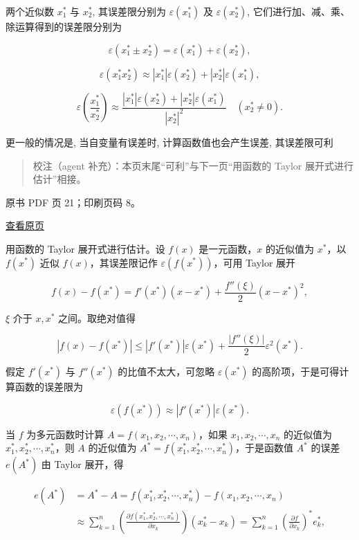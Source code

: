 两个近似数 \(x_1^*\) 与 \(x_2^*\), 其误差限分别为 \(\varepsilon(x_1^*)\) 及 \(\varepsilon(x_2^*)\), 它们进行加、减、乘、除运算得到的误差限分别为

\[
\varepsilon(x_1^* \pm x_2^*) = \varepsilon(x_1^*) + \varepsilon(x_2^*),
\]

\[
\varepsilon(x_1^* x_2^*) \approx |x_1^*| \varepsilon(x_2^*) + |x_2^*| \varepsilon(x_1^*),
\]

\[
\varepsilon\left(\frac{x_1^*}{x_2^*}\right) \approx \frac{|x_1^*| \varepsilon(x_2^*) + |x_2^*| \varepsilon(x_1^*)}{|x_2^*|^2} \quad (x_2^* \neq 0).
\]

更一般的情况是, 当自变量有误差时, 计算函数值也会产生误差, 其误差限可利

\begin{quote}
校注（agent 补充）：本页末尾``可利''与下一页``用函数的 Taylor 展开式进行估计''相接。
\end{quote}

\clearpage

原书 PDF 页 21；印刷页码 8。

\href{source-images/pdf-021.jpeg}{查看原页}

用函数的 Taylor 展开式进行估计。设 \(f(x)\) 是一元函数，\(x\) 的近似值为 \(x^*\)，以 \(f(x^*)\) 近似 \(f(x)\)，其误差限记作 \(\varepsilon(f(x^*))\)，可用 Taylor 展开

\[
f(x)-f(x^*)=f'(x^*)(x-x^*)+\frac{f''(\xi)}{2}(x-x^*)^2,
\]

\(\xi\) 介于 \(x,x^*\) 之间。取绝对值得

\[
|f(x)-f(x^*)|\leqslant |f'(x^*)|\varepsilon(x^*)+\frac{|f''(\xi)|}{2}\varepsilon^2(x^*).
\]

假定 \(f'(x^*)\) 与 \(f''(x^*)\) 的比值不太大，可忽略 \(\varepsilon(x^*)\) 的高阶项，于是可得计算函数的误差限为

\[
\varepsilon(f(x^*))\approx |f'(x^*)|\varepsilon(x^*).
\]

当 \(f\) 为多元函数时计算 \(A=f(x_1,x_2,\cdots,x_n)\)，如果 \(x_1,x_2,\cdots,x_n\) 的近似值为 \(x_1^*,x_2^*,\cdots,x_n^*\)，则 \(A\) 的近似值为 \(A^*=f(x_1^*,x_2^*,\cdots,x_n^*)\)，于是函数值 \(A^*\) 的误差 \(e(A^*)\) 由 Taylor 展开，得

\[
\begin{aligned}
e(A^*)&=A^*-A=f(x_1^*,x_2^*,\cdots,x_n^*)-f(x_1,x_2,\cdots,x_n)\\
&\approx\sum_{k=1}^{n}\left(\frac{\partial f(x_1^*,x_2^*,\cdots,x_n^*)}{\partial x_k}\right)(x_k^*-x_k)
=\sum_{k=1}^{n}\left(\frac{\partial f}{\partial x_k}\right)^*e_k^*,
\end{aligned}
\]

